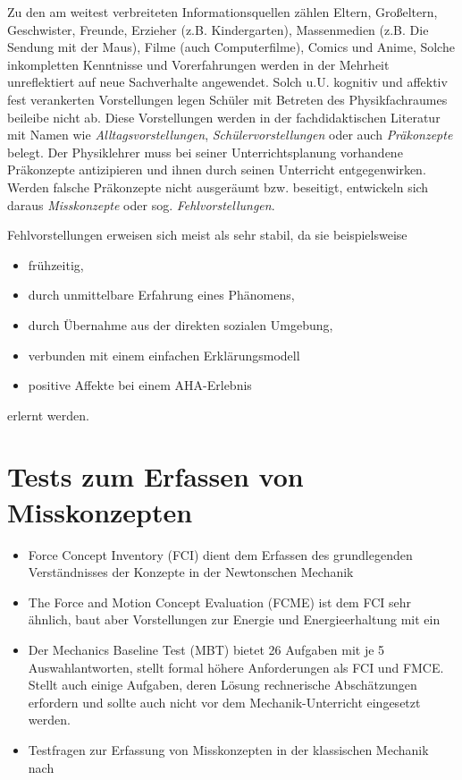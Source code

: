 Zu den am weitest verbreiteten Informationsquellen z{\"a}hlen Eltern, Gro{\ss}eltern, Geschwister, Freunde, Erzieher (z.B. Kindergarten), Massenmedien (z.B. Die Sendung mit der Maus), Filme (auch Computerfilme), Comics und Anime,  Solche inkompletten Kenntnisse und Vorerfahrungen werden in der Mehrheit unreflektiert auf neue Sachverhalte angewendet.
\mip
Solch u.U. kognitiv und affektiv fest verankerten Vorstellungen legen Sch{\"u}ler mit Betreten des Physikfachraumes beileibe nicht ab. Diese Vorstellungen werden in der fachdidaktischen Literatur mit Namen wie \emph{Alltagsvorstellungen}, \emph{Sch{\"u}lervorstellungen} oder auch \emph{Pr{\"a}konzepte} belegt. Der Physiklehrer muss bei seiner Unterrichtsplanung  vorhandene Pr{\"a}konzepte antizipieren und ihnen durch seinen Unterricht entgegenwirken. Werden falsche Pr{\"a}konzepte nicht ausger{\"a}umt bzw. beseitigt, entwickeln sich daraus \emph{Misskonzepte} oder sog. \emph{Fehlvorstellungen}.

Fehlvorstellungen erweisen sich meist als sehr stabil, da sie beispielsweise
\begin{itemize}
\item fr\"{u}hzeitig,
\item durch unmittelbare Erfahrung eines Ph\"{a}nomens,
\item durch \"{U}bernahme aus der direkten sozialen Umgebung,
\item verbunden mit einem einfachen Erkl\"{a}rungsmodell
\item positive Affekte bei einem AHA-Erlebnis
\end{itemize}
erlernt werden.

\bip\bip
\section{Tests zum Erfassen von Misskonzepten}

\begin{itemize}
\item Force Concept Inventory (FCI) dient dem Erfassen des grundlegenden Verst\"{a}ndnisses der Konzepte in der Newtonschen Mechanik
\item The Force and Motion Concept Evaluation (FCME) ist dem FCI sehr \"{a}hnlich, baut aber Vorstellungen zur Energie und Energieerhaltung mit ein
\item Der Mechanics Baseline Test (MBT) bietet 26 Aufgaben mit je 5 Auswahlantworten, stellt formal h\"{o}here Anforderungen als FCI und FMCE. Stellt auch einige Aufgaben, deren L\"{o}sung rechnerische Absch\"{a}tzungen erfordern und sollte auch nicht vor dem Mechanik-Unterricht eingesetzt werden.
\item Testfragen zur Erfassung von Misskonzepten in der klassischen Mechanik nach \textcite[8. Skizze, S. 144 ff.]{Nachtigall}
\end{itemize}

